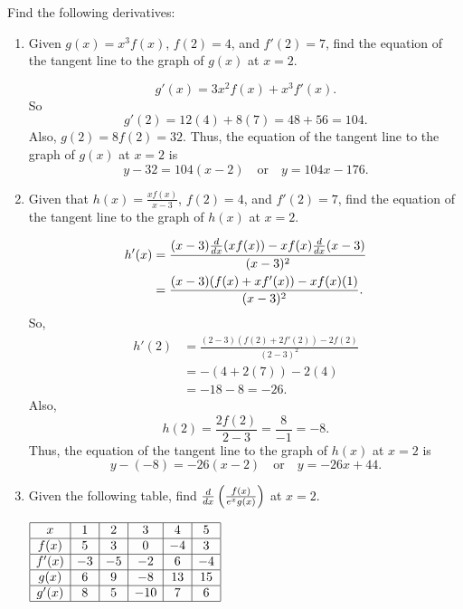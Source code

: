 \documentclass[handout,nooutcomes]{ximera}
\begin{document}
\begin{problem}
Find the following derivatives:
	\begin{enumerate}
	
	\item  Given $g(x) = x^3 f(x)$, $f(2) = 4$, and $f'(2) = 7$, find the equation of the tangent line to the graph of $g(x)$ at $x=2$.
		\begin{freeResponse}
		$$g'(x) = 3x^2 f(x) + x^3 f'(x).$$  
		So 
		$$g'(2) = 12(4) + 8(7) = 48 + 56 = 104.$$  
		Also, $g(2) = 8f(2) = 32$.  Thus, the equation of the tangent line to the graph of $g(x)$ at $x=2$ is
		$$y-32 = 104(x-2) \quad \text{or} \quad y = 104x - 176.$$  
		\end{freeResponse}
		
		
		
	\item  Given that $h(x) = \frac{x f(x)}{x-3}$, $f(2) = 4$, and $f'(2) = 7$, find the equation of the tangent line to the graph of $h(x)$ at $x=2$.  
		\begin{freeResponse}
		\begin{align*}
		h'(x) &= \frac{ (x-3)\frac{d}{dx}(xf(x)) - xf(x)\frac{d}{dx}(x-3)}{(x-3)^2}  \\
		&= \frac{(x-3)(f(x) + xf'(x)) - xf(x)(1)}{(x-3)^2}.
		\end{align*}
		So, 
		\begin{align*}
		h'(2) &= \frac{(2-3)(f(2) + 2f'(2)) - 2f(2)}{(2-3)^2}  \\
		&= -(4 + 2(7)) - 2(4)  \\
		&= -18 - 8 = -26.
		\end{align*}
		Also, 
		$$h(2) = \frac{2f(2)}{2-3} = \frac{8}{-1} = -8.$$  
		Thus, the equation of the tangent line to the graph of $h(x)$ at $x=2$ is
		$$y-(-8) = -26(x-2) \quad \text{or} \quad y = -26x + 44.$$  
		\end{freeResponse}
		
		
		
	\item  Given the following table, find $\frac{d}{dx} \left( \frac{f(x)}{e^x g(x)} \right)$ at $x=2$. 
	
	$\begin{array}{|c|c|c|c|c|c|}
	\hline
	x	&	1	&	2	&	3	&	4	&	5	\\
	\hline
	f(x)	&	5	&	3	&	0	&	-4	&	3	\\
	\hline
	f'(x)	&	-3	&	-5	&	-2	&	6	&	-4	\\
	\hline
	g(x)	&	6	&	9	&	-8	&	13	&	15	\\
	\hline
	g'(x)	&	8	&	5	&	-10	&	7	&	6	\\
	\hline
	\end{array}$
	

\end{enumerate}
\end{problem}
\end{document}
